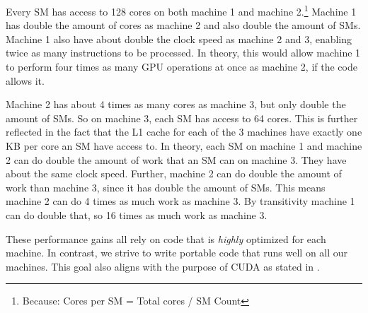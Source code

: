 Every SM has access to 128 cores on both machine 1 and machine 2.\footnote{Because: Cores per SM = Total cores / SM Count} Machine 1 has double the amount of cores as machine 2 and also double the amount of SMs. Machine 1 also have about double the clock speed as machine 2 and 3, enabling twice as many instructions to be processed. In theory, this would allow machine 1 to perform four times as many GPU operations at once as machine 2, if the code allows it.

Machine 2 has about 4 times as many cores as machine 3, but only double the amount of SMs. So on machine 3, each SM has access to 64 cores. This is further reflected in the fact that the L1 cache for each of the 3 machines have exactly one KB per core an SM have access to. In theory, each SM on machine 1 and machine 2 can do double the amount of work that an SM can on machine 3. They have about the same clock speed. Further, machine 2 can do double the amount of work than machine 3, since it has double the amount of SMs. This means machine 2 can do 4 times as much work as machine 3. By transitivity machine 1 can do double that, so 16 times as much work as machine 3.

These performance gains all rely on code that is \textit{highly} optimized for each machine. In contrast, we strive to write portable code that runs well on all our machines. This goal also aligns with the purpose of CUDA as stated in \cite[Section 1.3]{nvidia:cudadoc}.